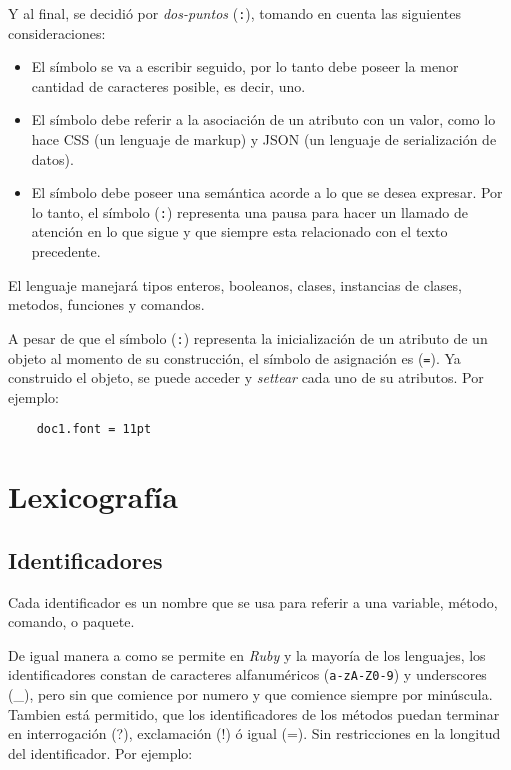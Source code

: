 \documentclass[12pt,letterpaper,titlepage,oneside,openright]{book}
\newcommand{\ruby}{\textit{Ruby}\xspace}
\begin{document}
Y al final, se decidió por \textit{dos-puntos} (\texttt{:}), tomando en cuenta
las siguientes consideraciones:

\begin{itemize}
\item El símbolo se va a escribir seguido, por lo tanto debe poseer la menor
      cantidad de caracteres posible, es decir, uno.
\item El símbolo debe referir a la asociación de un atributo con un valor, como lo
      hace CSS (un lenguaje de markup) y JSON (un lenguaje de serialización de
      datos).
\item El símbolo debe poseer una semántica acorde a lo que se desea expresar.
      Por lo tanto, el símbolo (\texttt{:}) representa una pausa para hacer un
      llamado de atención en lo que sigue y que siempre esta relacionado con el
      texto precedente. 
\end{itemize}

El lenguaje manejará tipos enteros, booleanos, clases, instancias de clases,
metodos, funciones y comandos.

A pesar de que el símbolo (\texttt{:}) representa la inicialización de un
atributo de un objeto al momento de su construcción, el símbolo de asignación es
(\texttt{=}). Ya construido el objeto, se puede acceder y \textit{settear} cada
uno de su atributos. Por ejemplo:

\begin{center}
\begin{lstlisting}
    doc1.font = 11pt
\end{lstlisting}
\end{center}

\section{Lexicografía}

\subsection{Identificadores}

Cada identificador es un nombre que se usa para referir a una variable, método,
comando, o paquete. 

De igual manera a como se permite en \ruby y la mayoría de los lenguajes, los
identificadores constan de caracteres alfanuméricos (\verb|a-zA-Z0-9|) y
underscores (\_), pero sin que comience por numero y que comience siempre por
minúscula. Tambien está permitido, que los identificadores de los métodos puedan
terminar en interrogación (?), exclamación (!) ó igual (=). Sin restricciones
en la longitud del identificador. Por ejemplo:
\end{document}
